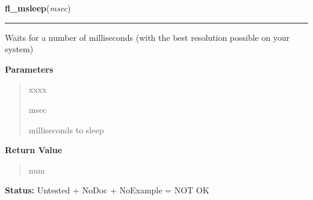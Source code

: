     \label{xformslib:library:fl_msleep}

    \vspace{0.5ex}

\hspace{.8\funcindent}\begin{boxedminipage}{\funcwidth}

    \raggedright \textbf{fl\_msleep}(\textit{msec})

    \vspace{-1.5ex}

    \rule{\textwidth}{0.5\fboxrule}
\setlength{\parskip}{2ex}
    Waits for a number of milliseconds (with the best resolution possible 
    on your system)

\setlength{\parskip}{1ex}
      \textbf{Parameters}
      \vspace{-1ex}

      \begin{quote}
        \begin{Ventry}{xxxx}

          \item[msec]

          milliseconds to sleep

        \end{Ventry}

      \end{quote}

      \textbf{Return Value}
    \vspace{-1ex}

      \begin{quote}
      num

      \end{quote}

\textbf{Status:} Untested + NoDoc + NoExample = NOT OK



    \end{boxedminipage}

    \label{xformslib:library:fl_is_same_object}

    \vspace{0.5ex}

